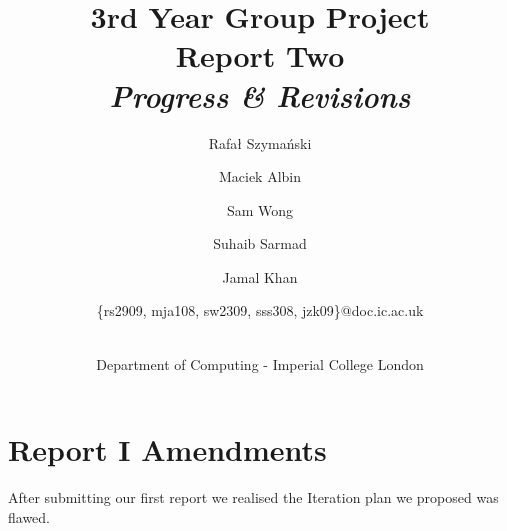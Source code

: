 \documentclass[a4paper,12pt]{article}
\title{3rd Year Group Project\\Report Two\\\emph{Progress \& Revisions}}
\author{
    \small{Rafał Szymański}\\
  	\and
    \small{Maciek Albin}\\
    \and
    \small{Sam Wong}\\
    \and
    \small{Suhaib Sarmad}\\
		\and
		\small{Jamal Khan}\\
		\and
		\small{\{rs2909, mja108, sw2309, sss308, jzk09\}@doc.ic.ac.uk}
		\and
		\\Department of Computing - Imperial College London
}
\date{}
\begin{document}
 
	\maketitle
	
	\section{Report I Amendments}
  After submitting our first report we realised the Iteration plan we proposed was flawed. 
\end{document}
